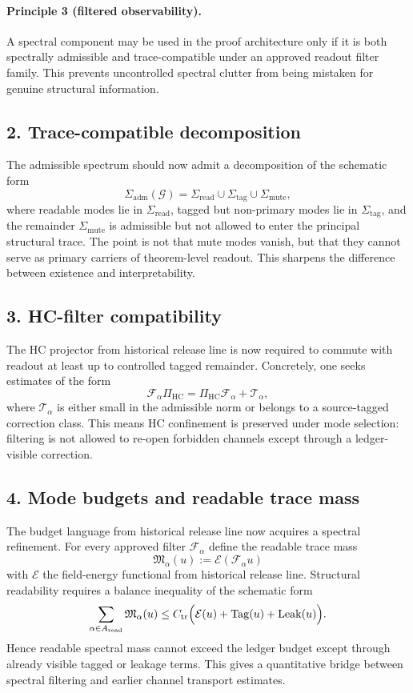 \documentclass[12pt,a4paper]{article}
\DeclareRobustCommand{\QSCver}[1]{archival stage}
\renewcommand{\QSCver}[1]{historical release line}
\begin{document}
\paragraph{Principle 3 (filtered observability).}
A spectral component may be used in the proof architecture only if it is both
spectrally admissible and trace-compatible under an approved readout filter family.
This prevents uncontrolled spectral clutter from being mistaken for genuine
structural information.

\subsection*{2. Trace-compatible decomposition}
The admissible spectrum should now admit a decomposition of the schematic form
\[
\Sigma_{\mathrm{adm}}(\mathcal G)
= \Sigma_{\mathrm{read}} \cup \Sigma_{\mathrm{tag}} \cup \Sigma_{\mathrm{mute}},
\]
where readable modes lie in $\Sigma_{\mathrm{read}}$, tagged but non-primary modes lie
in $\Sigma_{\mathrm{tag}}$, and the remainder $\Sigma_{\mathrm{mute}}$ is admissible but
not allowed to enter the principal structural trace. The point is not that mute
modes vanish, but that they cannot serve as primary carriers of theorem-level
readout. This sharpens the difference between existence and interpretability.

\subsection*{3. HC-filter compatibility}
The HC projector from \QSCver{v2.8.0} is now required to commute with readout at least up to
controlled tagged remainder. Concretely, one seeks estimates of the form
\[
\mathcal F_\alpha \Pi_{\mathrm{HC}}
= \Pi_{\mathrm{HC}} \mathcal F_\alpha + \mathcal T_\alpha,
\]
where $\mathcal T_\alpha$ is either small in the admissible norm or belongs to a
source-tagged correction class. This means HC confinement is preserved under mode
selection: filtering is not allowed to re-open forbidden channels except through a
ledger-visible correction.

\subsection*{4. Mode budgets and readable trace mass}
The budget language from \QSCver{v2.5.0} now acquires a spectral refinement. For every
approved filter $\mathcal F_\alpha$ define the readable trace mass
\[
\mathfrak M_\alpha(u) := \mathcal E(\mathcal F_\alpha u)
\]
with $\mathcal E$ the field-energy functional from \QSCver{v2.7.0}. Structural readability
requires a balance inequality of the schematic form
\[
\sum_{\alpha\in A_{\mathrm{read}}} \mathfrak M_\alpha(u)
\le C_{\mathrm{tr}}
\Bigl( \mathcal E(u) + \mathrm{Tag}(u) + \mathrm{Leak}(u) \Bigr).
\]
Hence readable spectral mass cannot exceed the ledger budget except through already
visible tagged or leakage terms. This gives a quantitative bridge between spectral
filtering and earlier channel transport estimates.
\end{document}
